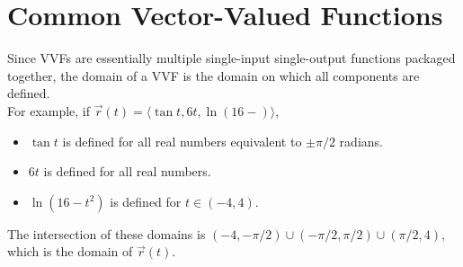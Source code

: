\section{Common Vector-Valued Functions}



\noindent
Since VVFs are essentially multiple single-input single-output functions packaged together, the domain of a VVF is the domain on which all components are defined.\\

\noindent
For example, if $\vec{r}(t) = \langle \tan{t},6t,\ln{\left(16-\right)} \rangle$,
\begin{itemize}
	\item $\tan{t}$ is defined for all real numbers equivalent to $\pm\pi/2$ radians.
	\item $6t$ is defined for all real numbers.
	\item $\ln{\left(16-t^2\right)}$ is defined for $t\in\left(-4,4\right)$.
\end{itemize}
The intersection of these domains is $\left(-4, -\pi/2\right) \cup \left(-\pi/2, \pi/2\right) \cup \left(\pi/2, 4\right)$, which is the domain of $\vec{r}(t)$.